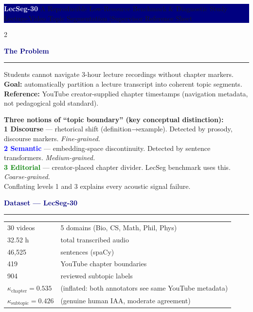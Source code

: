 \documentclass[10pt,a4paper]{article}
\newcommand{\hd}[1]{\medskip\textcolor{navy}{\textbf{\large #1}}\par\noindent\rule{\linewidth}{0.6pt}\smallskip}
\begin{document}
\pagestyle{empty}

\colorbox{navy}{\parbox{\linewidth}{\vspace{4pt}\centering
  \textcolor{white}{\LARGE\textbf{LecSeg-30}} \quad
  \textcolor{cyan!60!white}{\large A Reproducible Low-Resource Benchmark \& Diagnostic Study}\\[2pt]
  \textcolor{white!70!navy}{\normalsize Lecture-Video Topic Segmentation \quad|\quad Supervisor Reference Sheet}
\vspace{4pt}}}

\medskip
\begin{multicols}{2}

\hd{The Problem}
Students cannot navigate 3-hour lecture recordings without chapter markers.
\textbf{Goal:} automatically partition a lecture transcript into coherent topic segments.
\textbf{Reference:} YouTube creator-supplied chapter timestamps (navigation metadata, not pedagogical gold standard).

\medskip
\colorbox{lgrey}{\parbox{\linewidth}{\small
\textbf{Three notions of ``topic boundary'' (key conceptual distinction):}\\[2pt]
\textcolor{amber}{\textbf{1 Discourse}} — rhetorical shift (definition→example). Detected by prosody, discourse markers. \textit{Fine-grained.}\\
\textcolor{blue}{\textbf{2 Semantic}} — embedding-space discontinuity. Detected by sentence transformers. \textit{Medium-grained.}\\
\textcolor{green}{\textbf{3 Editorial}} — creator-placed chapter divider. LecSeg benchmark uses this. \textit{Coarse-grained.}\\[2pt]
Conflating levels 1 and 3 explains every acoustic signal failure.
}}

\hd{Dataset — LecSeg-30}
\begin{tabular}{@{}ll@{}}
30 videos & 5 domains (Bio, CS, Math, Phil, Phys) \\
32.52 h   & total transcribed audio \\
46{,}525  & sentences (spaCy) \\
419       & YouTube chapter boundaries \\
904       & reviewed subtopic labels \\
$\kappa_\text{chapter}=0.535$ & (inflated: both annotators see same YouTube metadata) \\
$\kappa_\text{subtopic}=0.426$ & (genuine human IAA, moderate agreement) \\
\end{tabular}


\end{multicols}
\end{document}
